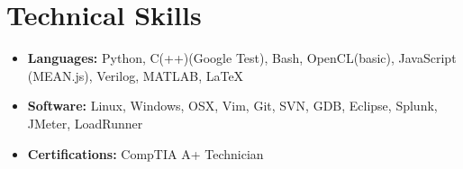 \documentclass[11pt,letterpaper,sans]{moderncv}
\begin{document}
\begin{itemize}

\end{itemize}




\section{Technical Skills}

\vspace{2pt}

\begin{itemize}
\item[]  \textbf{Languages:} Python, 
C(++)(Google Test), Bash, OpenCL(basic), JavaScript (MEAN.js), Verilog, MATLAB, LaTeX
\vspace{4pt}

\item[]  \textbf{Software:} Linux, Windows, OSX, Vim, Git, SVN, GDB,
Eclipse, Splunk, JMeter, LoadRunner 
\vspace{4pt}


\item[]  \textbf{Certifications:} CompTIA A+ Technician

\end{itemize}
\end{document}
